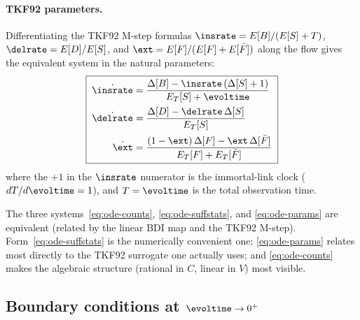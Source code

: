 \paragraph{TKF92 parameters.}
Differentiating the TKF92 M-step formulas
$\insrate=E[B]/(E[S]+T)$, $\delrate=E[D]/E[S]$, and
$\fragext=E[\nfragext]/(E[\nfragext]+E[\nfragend])$ along the flow gives the
equivalent system in the natural parameters:
\begin{equation}
\label{eq:ode-params}
\boxed{\;
\begin{aligned}
\dot{\insrate} &= \frac{\Delta[B] - \insrate\,(\Delta[S]+1)}{E_T[S]+\evoltime} \\[1pt]
\dot{\delrate} &= \frac{\Delta[D] - \delrate\,\Delta[S]}{E_T[S]} \\[1pt]
\dot{\fragext} &= \frac{(1-\fragext)\,\Delta[\nfragext] - \fragext\,\Delta[\nfragend]}{E_T[\nfragext]+E_T[\nfragend]}
\end{aligned}\;}
\end{equation}
where the $+1$ in the $\insrate$ numerator is the immortal-link clock
($dT/d\evoltime=1$), and $T=\evoltime$ is the total observation time.

The three systems~\eqref{eq:ode-counts}, \eqref{eq:ode-suffstats}, and
\eqref{eq:ode-params} are equivalent (related by the linear BDI map and the
TKF92 M-step).  Form~\eqref{eq:ode-suffstats} is the numerically convenient
one; \eqref{eq:ode-params} relates most directly to the TKF92 surrogate one
actually uses; and \eqref{eq:ode-counts} makes the algebraic structure
(rational in $C$, linear in $V$) most visible.

\subsection{Boundary conditions at \texorpdfstring{$\evoltime\to0^+$}{t -> 0+}}
\label{sec:comp-boundary}

